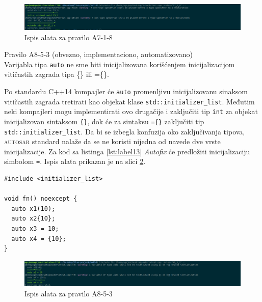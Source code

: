 \documentclass[12pt,oneside]{memoir}
\begin{document}
\begin{figure}[!h]
\begin{center}
\includegraphics[scale=0.3]{A7-1-8.png}
\end{center}
\caption{Ispis alata za pravilo A7-1-8}
\label{fig:A7-1-8}
\end{figure}

\begin{primer}
Pravilo A8-5-3 (obvezno, implementaciono, automatizovano) \\
Varijabla tipa \texttt{auto} ne sme biti inicijalizovana kori\v{s}\'{c}enjem
inicijalizacijom viti\v{c}astih zagrada tipa \{\} ili =\{\}.
\end{primer}

Po standardu C++14 kompajler \'{c}e \texttt{auto} promenljivu inicijalizovanu sinaksom viti\v{c}astih zagrada tretirati kao objekat klase
\texttt{std::initializer\_list}. Međutim neki kompajleri mogu implementirati ovo druga\v{c}ije i zaklju\v{c}iti tip \texttt{int} za objekat inicijalizovan
sintaksom \texttt{\{\}}, dok \'{c}e za sintaksu \texttt{=\{\}} zaklju\v{c}iti tip \texttt{std::initializer\_list}. Da bi se izbegla konfuzija oko zaklju\v{c}ivanja
tipova, \textsc{autosar} standard nala\v{z}e da se ne koristi nijedna od navede dve vrste inicijalizacije. Za kod sa listinga \ref{lst:label13} \textit{Autofix} \'{c}e
predlo\v{z}iti inicijalizaciju simbolom \texttt{=}. Ispis alata prikazan je na slici \ref{fig:A8-5-3}. \\

\begin{lstlisting}[style=customc, caption={Primer koda koji nije napisan u skladu sa pravilom A8-5-3}, label=lst:label13, captionpos=b]
#include <initializer_list>

void fn() noexcept {
  auto x1(10);
  auto x2{10};
  auto x3 = 10;
  auto x4 = {10};
}

\end{lstlisting}

\begin{figure}[!h]
\begin{center}
\includegraphics[scale=0.3]{A8-5-3.png}
\end{center}
\caption{Ispis alata za pravilo A8-5-3}
\label{fig:A8-5-3}
\end{figure}
\end{document}
